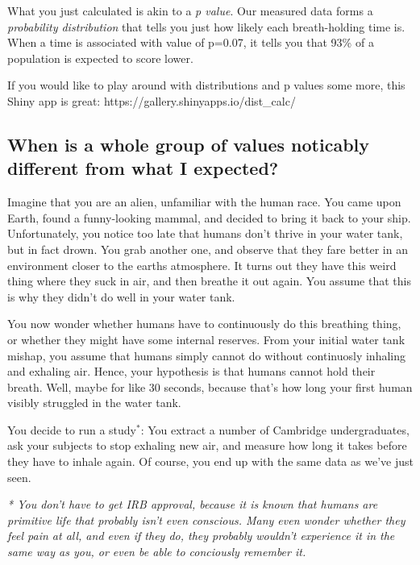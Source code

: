 \documentclass[11pt]{article}
\begin{document}
What you just calculated is akin to a \emph{p value}. Our measured data
forms a \emph{probability distribution} that tells you just how likely
each breath-holding time is. When a time is associated with value of
p=0.07, it tells you that 93\% of a population is expected to score
lower.

If you would like to play around with distributions and p values some
more, this Shiny app is great: https://gallery.shinyapps.io/dist\_calc/

    \subsection{When is a whole group of values noticably different from
what I
expected?}\label{when-is-a-whole-group-of-values-noticably-different-from-what-i-expected}

Imagine that you are an alien, unfamiliar with the human race. You came
upon Earth, found a funny-looking mammal, and decided to bring it back
to your ship. Unfortunately, you notice too late that humans don't
thrive in your water tank, but in fact drown. You grab another one, and
observe that they fare better in an environment closer to the earths
atmosphere. It turns out they have this weird thing where they suck in
air, and then breathe it out again. You assume that this is why they
didn't do well in your water tank.

You now wonder whether humans have to continuously do this breathing
thing, or whether they might have some internal reserves. From your
initial water tank mishap, you assume that humans simply cannot do
without continuosly inhaling and exhaling air. Hence, your hypothesis is
that humans cannot hold their breath. Well, maybe for like 30 seconds,
because that's how long your first human visibly struggled in the water
tank.

You decide to run a study\(^*\): You extract a number of Cambridge
undergraduates, ask your subjects to stop exhaling new air, and measure
how long it takes before they have to inhale again. Of course, you end
up with the same data as we've just seen.

\emph{* You don't have to get IRB approval, because it is known that
humans are primitive life that probably isn't even conscious. Many even
wonder whether they feel pain at all, and even if they do, they probably
wouldn't experience it in the same way as you, or even be able to
conciously remember it.}
\end{document}
